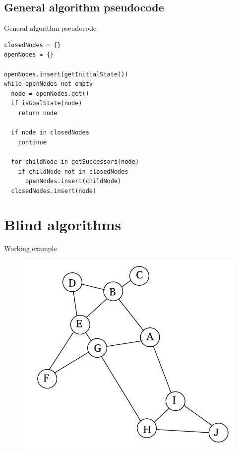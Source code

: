 \documentclass{beamer}
\begin{document}
\subsection{General algorithm pseudocode}

\begin{frame}[fragile]{General algorithm pseudocode}
	\begin{lstlisting}
closedNodes = {}
openNodes = {}

openNodes.insert(getInitialState())
while openNodes not empty 
  node = openNodes.get()
  if isGoalState(node)
    return node
		
  if node in closedNodes
    continue
	
  for childNode in getSuccessors(node)
    if childNode not in closedNodes
      openNodes.insert(childNode)
  closedNodes.insert(node)
	\end{lstlisting}
\end{frame}

\section{Blind algorithms}

\begin{frame}{Working example}

	\begin{figure}
	\centering
		\includegraphics[width=0.75\linewidth]{example.jpg}
	\end{figure}

\end{frame}
\end{document}
